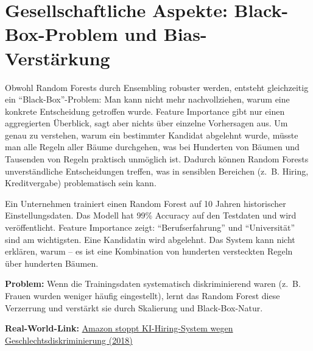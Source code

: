 \section{Gesellschaftliche Aspekte: Black-Box-Problem und Bias-Verstärkung}

\begin{mydefinition}
    Obwohl Random Forests durch Ensembling robuster werden, entsteht gleichzeitig ein \enquote{Black-Box}-Problem: Man kann nicht mehr nachvollziehen, warum eine konkrete Entscheidung getroffen wurde. Feature Importance gibt nur einen aggregierten Überblick, sagt aber nichts über einzelne Vorhersagen aus. Um genau zu verstehen, warum ein bestimmter Kandidat abgelehnt wurde, müsste man alle Regeln aller Bäume durchgehen, was bei Hunderten von Bäumen und Tausenden von Regeln praktisch unmöglich ist. Dadurch können Random Forests unverständliche Entscheidungen treffen, was in sensiblen Bereichen (z.~B. Hiring, Kreditvergabe) problematisch sein kann.
\end{mydefinition}

\begin{myexample}
    Ein Unternehmen trainiert einen Random Forest auf 10 Jahren historischer Einstellungsdaten. Das Modell hat 99\% Accuracy auf den Testdaten und wird veröffentlicht. Feature Importance zeigt: \enquote{Berufserfahrung} und \enquote{Universität} sind am wichtigsten. Eine Kandidatin wird abgelehnt. Das System kann nicht erklären, warum -- es ist eine Kombination von hunderten versteckten Regeln über hunderten Bäumen.

    \textbf{Problem:} Wenn die Trainingsdaten systematisch diskriminierend waren (z.~B. Frauen wurden weniger häufig eingestellt), lernt das Random Forest diese Verzerrung und verstärkt sie durch Skalierung und Black-Box-Natur.

    \textbf{Real-World-Link:} \href{https://www.reuters.com/article/world/insight-amazon-scraps-secret-ai-recruiting-tool-that-showed-bias-against-women-idUSKCN1MK0AG/}{Amazon stoppt KI-Hiring-System wegen Geschlechtsdiskriminierung (2018)}
\end{myexample}

